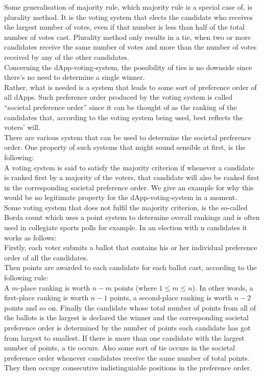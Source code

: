 Some generalisation of majority rule, which majority rule is a special case of, is plurality method. It is the voting system that elects the candidate who receives the largest number of votes, even if that number is less than half of the total number of votes cast. Plurality method only results in a tie, when two or more candidates receive the same number of votes and more than the number of votes received by any of the other candidates. \\
Concerning the dApp-voting-system, the possibility of ties is no downside since there's no need to determine a single winner.\\ %
Rather, what is needed is a system that leads to some sort of preference order of all dApps. Such preference order produced by the voting system is called ``societal preference order'' since it can be thought of as the ranking of the candidates that, according to the voting system being used, best reflects the voters' will. \\
There are various system that can be used to determine the societal preference order. One property of such systems that might sound sensible at first, is the following: \\
A voting system is said to satisfy the majority criterion if whenever a candidate is ranked first by a majority of the voters, that candidate will also be ranked first in the corresponding societal preference order. We give an example for why this would be no legitimate property for the dApp-voting-system in a moment.\\
Some voting system that does not fulfil the majority criterion, is the so-called Borda count which uses a point system to determine overall rankings and is often used in collegiate sports polls for example. In an election with n candidates it works as follows: \\
Firstly, each voter submits a ballot that contains his or her individual preference order of all the candidates. \\
Then points are awarded to each candidate for each ballot cast, according to the following rule: \\
A $m$-place ranking is worth $n-m$ points (where $1\leq m \leq n$). In other words, a first-place ranking is worth $n-1$ points, a second-place ranking is worth $n-2$ points and so on. 
Finally the candidate whose total number of points from all of the ballots is the largest is declared the winner and the corresponding societal preference order is determined by the number of points each candidate has got from largest to smallest. If there is more than one candidate with the largest number of points, a tie occurs. Also some sort of tie occurs in the societal preference order whenever candidates receive the same number of total points. They then occupy consecutive indistinguiable positions in the preference order. \\
